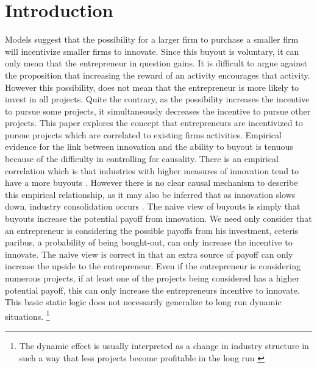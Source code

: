 \section{Introduction}
Models suggest that the possibility for a larger firm to purchase a smaller firm will incentivize smaller firms to innovate. Since this buyout is voluntary, it can only mean that the entrepreneur in question gains. It is difficult to argue against the proposition that increasing the reward of an activity encourages that activity. However this possibility, does not mean that the entrepreneur is more likely to invest in all projects. Quite the contrary, as the possibility increases the incentive to pursue some projects, it simultaneously decreases the incentive to pursue other projects. This paper explores the concept that entrepreneurs are incentivized to pursue projects which are correlated to existing firms activities.
Empirical evidence for the link between innovation and the ability to buyout is tenuous because of the difficulty in controlling for causality. There is an empirical correlation which is that industries with higher measures of innovation tend to have a more buyouts \citep{HAU}. However there is no clear causal mechanism to describe this empirical relationship, as it may also be inferred that as innovation slows down, industry consolidation occurs \citep{COM}. 
The naive view of buyouts is simply that buyouts increase the potential payoff from innovation. We need only consider that an entrepreneur is considering the possible payoffs from his investment, ceteris paribus, a probability of being bought-out, can only increase the incentive to innovate. The naive view is correct in that an extra source of payoff can only increase the upside to the entrepreneur. Even if the entrepreneur is considering numerous projects, if at least one of the projects being considered has a higher potential payoff, this can only increase the entrepreneurs incentive to innovate. This basic static logic does not necessarily generalize to long run dynamic situations. \footnote{The dynamic effect is usually interpreted as a change in industry structure in such a way that less projects become profitable in the long run \cite{bessen_maskin}}
